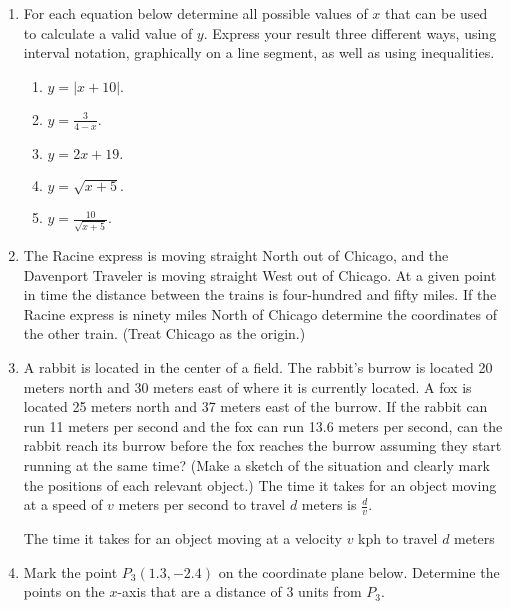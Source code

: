 \begin{enumerate}
\item For each equation below determine all possible values of $x$
  that can be used to calculate a valid value of $y$. Express your
  result three different ways, using interval notation, graphically on
  a line segment, as well as using inequalities.
  \begin{enumerate}
  \item $\displaystyle y=|x+10|.$
  \item $\displaystyle y=\frac{3}{4-x}.$
  \item $\displaystyle y=2x+19.$
  \item $\displaystyle y = \sqrt{x+5}.$
  \item $\displaystyle y = \frac{10}{\sqrt{x+5}}.$
  \end{enumerate}

\item The Racine express is moving straight North out of Chicago, and
  the Davenport Traveler is moving straight West out of Chicago. At a
  given point in time the distance between the trains is four-hundred
  and fifty miles. If the Racine express is ninety miles North of
  Chicago determine the coordinates of the other train. (Treat Chicago
  as the origin.)

\item A rabbit is located in the center of a field. The rabbit's
  burrow is located 20 meters north and 30 meters east of where it is
  currently located. A fox is located 25 meters north and 37 meters
  east of the burrow. If the rabbit can run 11 meters per second and
  the fox can run 13.6 meters per second, can the rabbit reach its
  burrow before the fox reaches the burrow assuming they start running
  at the same time? (Make a sketch of the situation and clearly mark
  the positions of each relevant object.) The time it takes for an
  object moving at a speed of $v$ meters per second to travel $d$
  meters is $\frac{d}{v}$.

  The time it takes for an object moving at a velocity $v$ kph to travel
  $d$ meters 

  \item Mark the point $P_3(1.3,-2.4)$ on the coordinate plane below. Determine the
  points on the $x$-axis that are a distance of 3 units from $P_3$.


\end{enumerate}
